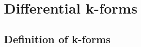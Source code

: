\documentclass[notes]{subfiles}
\begin{document}
\setcounter{section}{6}
\section{Differential k-forms}
\subsection{Definition of k-forms}
\end{document}
